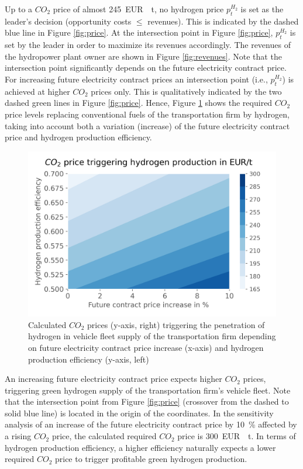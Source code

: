 \documentclass[review]{elsarticle}
\begin{document}
Up to a $CO_2$ price of almost \SI{245}{EUR \per t}, no hydrogen price $p_t^{H_2}$ is set as the leader's decision (opportunity costs $\leq$ revenues). This is indicated by the dashed blue line in Figure \ref{fig:price}. At the intersection point in Figure \ref{fig:price}, $p_t^{H_2}$ is set by the leader in order to maximize its revenues accordingly. The revenues of the hydropower plant owner are shown in Figure \ref{fig:revenues}. Note that the intersection point significantly depends on the future electricity contract price. For increasing future electricity contract prices an intersection point (i.e., $p_t^{H_2}$) is achieved at higher $CO_2$ prices only. This is qualitatively indicated by the two dashed green lines in Figure \ref{fig:price}. Hence, Figure \ref{fig:contour} shows the required $CO_2$ price levels replacing conventional fuels of the transportation firm by hydrogen, taking into account both a variation (increase) of the future electricity contract price and hydrogen production efficiency. 

\begin{figure}[h]
	\centering
	\includegraphics[width=0.8\linewidth]{figures/Contour.png}
	\caption{Calculated $CO_2$ prices (y-axis, right) triggering the penetration of hydrogen in vehicle fleet supply of the transportation firm depending on future electricity contract price increase (x-axis) and hydrogen production efficiency (y-axis, left)}
	\label{fig:contour}
\end{figure}

An increasing future electricity contract price expects higher $CO_2$ prices, triggering green hydrogen supply of the transportation firm's vehicle fleet. Note that the intersection point from Figure \ref{fig:price} (crossover from the dashed to solid blue line) is located in the origin of the coordinates. In the sensitivity analysis of an increase of the future electricity contract price by \SI{10}{\%} affected by a rising $CO_2$ price, the calculated required $CO_2$ price is \SI{300}{EUR \per t}. In terms of hydrogen production efficiency, a higher efficiency naturally expects a lower required $CO_2$ price to trigger profitable green hydrogen production. 
\end{document}
